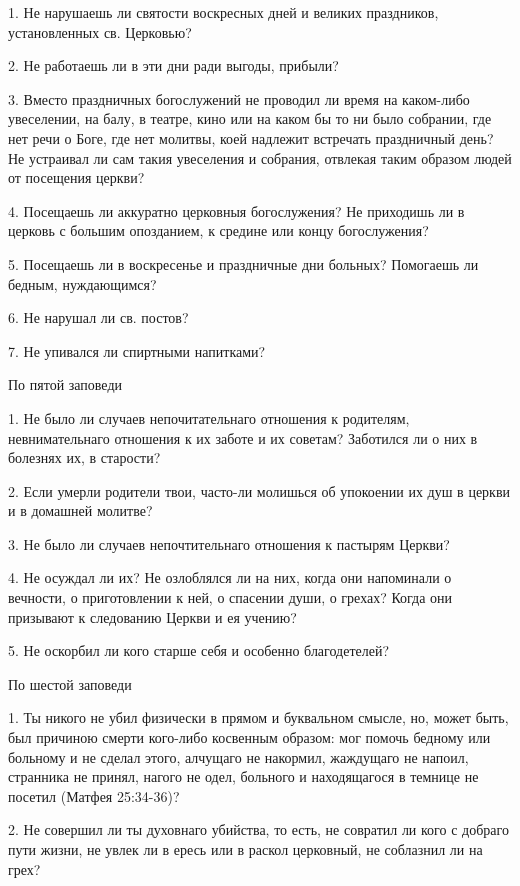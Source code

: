 \normalfont{}\normalfont{}1. Не нарушаешь ли святости воскресных дней и великих праздников, установленных св. Церковью?

2. Не работаешь ли в эти дни ради выгоды, прибыли?

3. Вместо праздничных богослужений не проводил ли время на каком-либо увеселении, на балу, в театре, кино или на каком бы то ни было собрании, где нет речи о Боге, где нет молитвы, коей надлежит встречать праздничный день? Не устраивал ли сам такия увеселения и собрания, отвлекая таким образом людей от посещения церкви?

4. Посещаешь ли аккуратно церковныя богослужения? Не приходишь ли в церковь с большим опозданием, к средине или концу богослужения?

5. Посещаешь ли в воскресенье и праздничные дни больных? Помогаешь ли бедным, нуждающимся?

6. Не нарушал ли св. постов?

7. Не упивался ли спиртными напитками? 

\bfseries \itshape 

По пятой заповеди

\normalfont{}\normalfont{}1. Не было ли случаев непочитательнаго отношения к родителям, невнимательнаго отношения к их заботе и их советам? Заботился ли о них в болезнях их, в старости?

2. Если умерли родители твои, часто-ли молишься об упокоении их душ в церкви и в домашней молитве?

3. Не было ли случаев непочтительнаго отношения к пастырям Церкви?

4. Не осуждал ли их? Не озлоблялся ли на них, когда они напоминали о вечности, о приготовлении к ней, о спасении души, о грехах? Когда они призывают к следованию Церкви и ея учению?

5. Не оскорбил ли кого старше себя и особенно благодетелей? 

\bfseries \itshape 

По шестой заповеди

\normalfont{}\normalfont{}1. Ты никого не убил физически в прямом и буквальном смысле, но, может быть, был причиною смерти кого-либо косвенным образом: мог помочь бедному или больному и не сделал этого, алчущаго не накормил, жаждущаго не напоил, странника не принял, нагого не одел, больного и находящагося в темнице не посетил (Матфея 25:34-36)?

2. Не совершил ли ты духовнаго убийства, то есть, не совратил ли кого с добраго пути жизни, не увлек ли в ересь или в раскол церковный, не соблазнил ли на грех?

